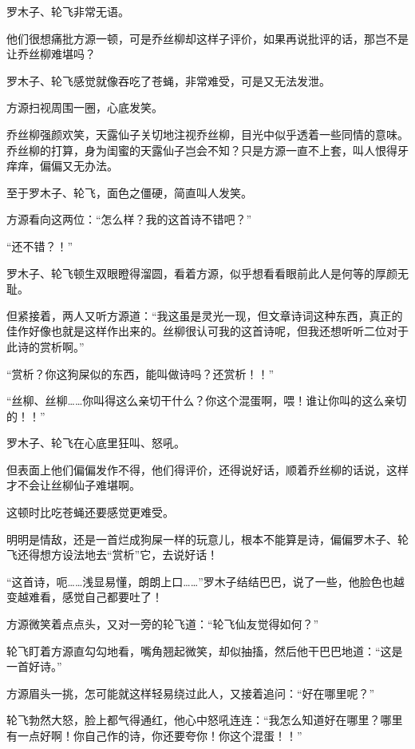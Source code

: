 
\begin{this_body}

罗木子、轮飞非常无语。

他们很想痛批方源一顿，可是乔丝柳却这样子评价，如果再说批评的话，那岂不是让乔丝柳难堪吗？

罗木子、轮飞感觉就像吞吃了苍蝇，非常难受，可是又无法发泄。

方源扫视周围一圈，心底发笑。

乔丝柳强颜欢笑，天露仙子关切地注视乔丝柳，目光中似乎透着一些同情的意味。乔丝柳的打算，身为闺蜜的天露仙子岂会不知？只是方源一直不上套，叫人恨得牙痒痒，偏偏又无办法。

至于罗木子、轮飞，面色之僵硬，简直叫人发笑。

方源看向这两位：“怎么样？我的这首诗不错吧？”

“还不错？！”

罗木子、轮飞顿生双眼瞪得溜圆，看着方源，似乎想看看眼前此人是何等的厚颜无耻。

但紧接着，两人又听方源道：“我这虽是灵光一现，但文章诗词这种东西，真正的佳作好像也就是这样作出来的。丝柳很认可我的这首诗呢，但我还想听听二位对于此诗的赏析啊。”

“赏析？你这狗屎似的东西，能叫做诗吗？还赏析！！”

“丝柳、丝柳……你叫得这么亲切干什么？你这个混蛋啊，喂！谁让你叫的这么亲切的！！”

罗木子、轮飞在心底里狂叫、怒吼。

但表面上他们偏偏发作不得，他们得评价，还得说好话，顺着乔丝柳的话说，这样才不会让丝柳仙子难堪啊。

这顿时比吃苍蝇还要感觉更难受。

明明是情敌，还是一首烂成狗屎一样的玩意儿，根本不能算是诗，偏偏罗木子、轮飞还得想方设法地去“赏析”它，去说好话！

“这首诗，呃……浅显易懂，朗朗上口……”罗木子结结巴巴，说了一些，他脸色也越变越难看，感觉自己都要吐了！

方源微笑着点点头，又对一旁的轮飞道：“轮飞仙友觉得如何？”

轮飞盯着方源直勾勾地看，嘴角翘起微笑，却似抽搐，然后他干巴巴地道：“这是一首好诗。”

方源眉头一挑，怎可能就这样轻易绕过此人，又接着追问：“好在哪里呢？”

轮飞勃然大怒，脸上都气得通红，他心中怒吼连连：“我怎么知道好在哪里？哪里有一点好啊！你自己作的诗，你还要夸你！你这个混蛋！！”


\end{this_body}
